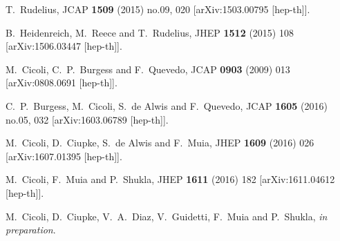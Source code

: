 \begin{thebibliography}{10}
  T.~Rudelius,
  JCAP {\bf 1509} (2015) no.09,  020
  [arXiv:1503.00795 [hep-th]].


  B.~Heidenreich, M.~Reece and T.~Rudelius,
  JHEP {\bf 1512} (2015) 108
  [arXiv:1506.03447 [hep-th]].


  M.~Cicoli, C.~P.~Burgess and F.~Quevedo,
  JCAP {\bf 0903} (2009) 013
  [arXiv:0808.0691 [hep-th]].


  C.~P.~Burgess, M.~Cicoli, S.~de Alwis and F.~Quevedo,
  JCAP {\bf 1605} (2016) no.05,  032
  [arXiv:1603.06789 [hep-th]].


  M.~Cicoli, D.~Ciupke, S.~de Alwis and F.~Muia,
  JHEP {\bf 1609} (2016) 026
  [arXiv:1607.01395 [hep-th]].


  M.~Cicoli, F.~Muia and P.~Shukla,
  JHEP {\bf 1611} (2016) 182
  [arXiv:1611.04612 [hep-th]].

  M.~Cicoli, D.~Ciupke, V.~A.~Diaz, V.~Guidetti, F.~Muia and P.~Shukla,
  \textit{in preparation}.  


\end{thebibliography}

